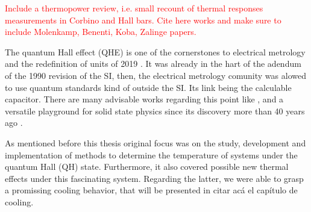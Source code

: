 

\textcolor{red}{Include a thermopower review, i.e. small recount of thermal responses measurements in Corbino and Hall bars. Cite here works and make sure to include Molenkamp, Benenti, Koba, Zalinge papers. }

The quantum Hall effect (QHE) \cite{klitzing1980new} is one of the cornerstones to electrical metrology and the redefinition of units of 2019 \cite{CGPM26}. It was already in the hart of the adendum of the 1990 revision of the SI, then, the electrical metrology comunity was alowed to use quantum standards kind of outside the SI. Its link being the calculable capacitor. There are many advisable works regarding this point like \cite{Valdes2019}
, and a versatile playground for solid state physics since its discovery more than 40 years ago \cite{klitzing1980new}.

As mentioned before this thesis original focus was on the study, development and implementation of methods to determine the temperature of systems under the quantum Hall (QH) state. Furthermore, it also covered possible new thermal effects under this fascinating system. Regarding the latter, we were able to grasp a promissing cooling behavior, that will be presented in \textcolor{tmagenta}{citar acá el capítulo de cooling}.

